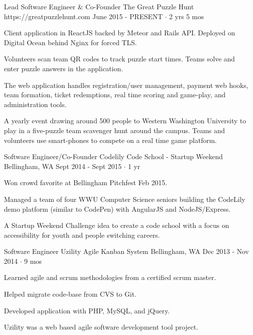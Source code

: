 \documentclass[11pt, a4paper]{awesome-cv}
\begin{document}
\begin{cventries}

  \cventry
    {Lead Software Engineer \& Co-Founder} %
    {The Great Puzzle Hunt} %
    {https://greatpuzzlehunt.com} %
    {June 2015 - PRESENT $\cdot$ 2 yrs 5 mos} %
    {
      \begin{cvitems} %
        \item Client application in ReactJS backed by Meteor and Rails API. Deployed on Digital Ocean behind Nginx for forced TLS.
        \item Volunteers scan team QR codes to track puzzle start times. Teams solve and enter puzzle answers in the application.
        \item The web application handles registration/user management, payment web hooks, team formation, ticket redemptions, real time scoring and game-play, and administration tools.
      \end{cvitems}
    }
    {
      A yearly event drawing around 500 people to Western Washington University to play in a five-puzzle team scavenger hunt around the campus.
      Teams and volunteers use smart-phones to compete on a real time game platform.
    }

  \cventry
    {Software Engineer/Co-Founder} %
    {Codelily Code School - Startup Weekend} %
    {Bellingham, WA} %
    {Sept 2014 - Sept 2015 $\cdot$ 1 yr} %
    {
      \begin{cvitems} %
        \item Won crowd favorite at Bellingham Pitchfest Feb 2015.
        \item Managed a team of four WWU Computer Science seniors building the CodeLily demo platform (similar to CodePen) with AngularJS and NodeJS/Express.
      \end{cvitems}
    }
    {A Startup Weekend Challenge idea to create a code school with a focus on accessibility for youth and people switching careers.}

  \cventry
    {Software Engineer} %
    {Uzility Agile Kanban System} %
    {Bellingham, WA} %
    {Dec 2013 - Nov 2014 $\cdot$ 9 mos} %
    {
      \begin{cvitems} %
        \item Learned agile and scrum methodologies from a certified scrum master.
        \item Helped migrate code-base from CVS to Git.
        \item Developed application with PHP, MySQL, and jQuery.
      \end{cvitems}
    }
    {Uzility was a web based agile software development tool project.}
\end{cventries}
\end{document}
